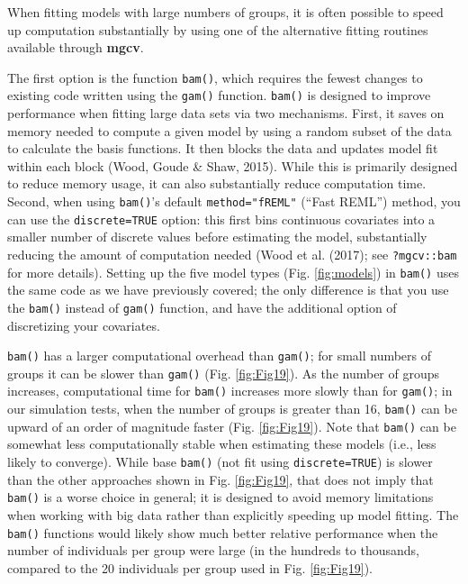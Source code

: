 \documentclass[12pt]{article}
\begin{document}
When fitting models with large numbers of groups, it is often possible
to speed up computation substantially by using one of the alternative
fitting routines available through \textbf{mgcv}.

The first option is the function \texttt{bam()}, which requires the
fewest changes to existing code written using the \texttt{gam()}
function. \texttt{bam()} is designed to improve performance when fitting
large data sets via two mechanisms. First, it saves on memory needed to
compute a given model by using a random subset of the data to calculate
the basis functions. It then blocks the data and updates model fit
within each block (Wood, Goude \& Shaw, 2015). While this is primarily
designed to reduce memory usage, it can also substantially reduce
computation time. Second, when using \texttt{bam()}'s default
\texttt{method="fREML"} (``Fast REML'') method, you can use the
\texttt{discrete=TRUE} option: this first bins continuous covariates
into a smaller number of discrete values before estimating the model,
substantially reducing the amount of computation needed (Wood et al.
(2017); see \texttt{?mgcv::bam} for more details). Setting up the five
model types (Fig. \ref{fig:models}) in \texttt{bam()} uses the same code
as we have previously covered; the only difference is that you use the
\texttt{bam()} instead of \texttt{gam()} function, and have the
additional option of discretizing your covariates.

\texttt{bam()} has a larger computational overhead than \texttt{gam()};
for small numbers of groups it can be slower than \texttt{gam()} (Fig.
\ref{fig:Fig19}). As the number of groups increases, computational time
for \texttt{bam()} increases more slowly than for \texttt{gam()}; in our
simulation tests, when the number of groups is greater than 16,
\texttt{bam()} can be upward of an order of magnitude faster (Fig.
\ref{fig:Fig19}). Note that \texttt{bam()} can be somewhat less
computationally stable when estimating these models (i.e., less likely
to converge). While base \texttt{bam()} (not fit using
\texttt{discrete=TRUE}) is slower than the other approaches shown in
Fig. \ref{fig:Fig19}, that does not imply that \texttt{bam()} is a worse
choice in general; it is designed to avoid memory limitations when
working with big data rather than explicitly speeding up model fitting.
The \texttt{bam()} functions would likely show much better relative
performance when the number of individuals per group were large (in the
hundreds to thousands, compared to the 20 individuals per group used in
Fig. \ref{fig:Fig19}).
\end{document}
